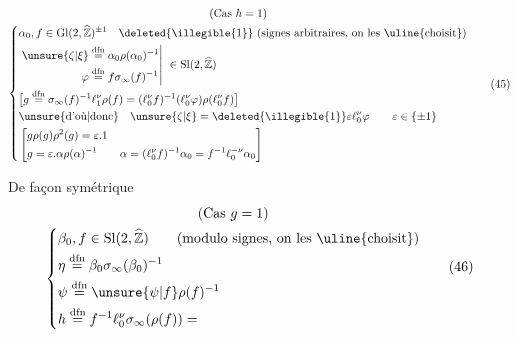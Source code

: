 \[
\begin{gathered}
\text{(Cas }h=1\text{)}\\
\left\{
\begin{aligned}
 &\alpha_0,f\in\mathrm{Gl}(2,\widehat{\mathbb Z})^{\pm1}
 \quad \deleted{\illegible{1}}\ \text{(signes arbitraires, on les \uline{choisit})}\\
 &\left.
 \begin{aligned}
 \unsure{\zeta|\xi}&\overset{\mathrm{dfn}}=\alpha_0\rho(\alpha_0)^{-1}\\
 \varphi&\overset{\mathrm{dfn}}=f\sigma_\infty(f)^{-1}
 \end{aligned}
 \right|\ \in\mathrm{Sl}(2,\widehat{\mathbb Z})\\
 &\bigl[g\overset{\mathrm{dfn}}=\sigma_\infty(f)^{-1}\ell_1^\nu\rho(f)
 =(\ell_0^\nu f)^{-1}(\ell_0^\nu\varphi)\rho(\ell_0^\nu f)\bigr]\\
 &\text{\unsure{d'où|donc}}\quad
 \unsure{\zeta|\xi}=\deleted{\illegible{1}}\varepsilon\ell_0^\nu\varphi
 \qquad\varepsilon\in\{\pm1\}\\
 &\left[\begin{aligned}
 &g\rho(g)\rho^2(g)=\varepsilon.1\\
 &g=\varepsilon.\alpha\rho(\alpha)^{-1}
 \qquad\alpha=(\ell_0^\nu f)^{-1}\alpha_0=f^{-1}\ell_0^{-\nu}\alpha_0
 \end{aligned}\right]
\end{aligned}
\right.
\end{gathered}
\tag{45}
\]


De façon symétrique
\[
\begin{gathered}
\text{(Cas }g=1\text{)}\\
\left\{
\begin{aligned}
 &\beta_0,f\in\mathrm{Sl}(2,\widehat{\mathbb Z})
 \qquad\text{(modulo signes, on les \uline{choisit})}\\
 &\eta\overset{\mathrm{dfn}}=\beta_0\sigma_\infty(\beta_0)^{-1}\\
 &\psi\overset{\mathrm{dfn}}=\unsure{\psi|f}\rho(f)^{-1}\\
 &h\overset{\mathrm{dfn}}=f^{-1}\ell_0^\nu\sigma_\infty(\rho(f))=
\end{aligned}
\right.
\end{gathered}
\tag{46}
\]

